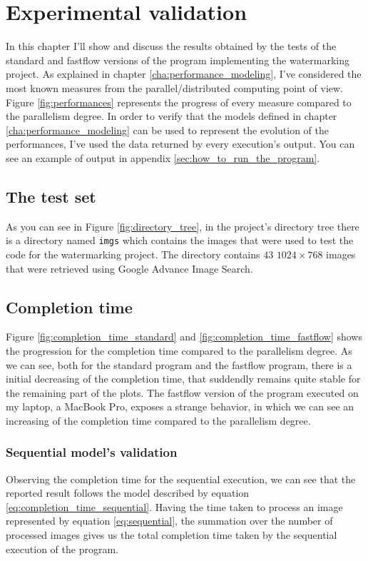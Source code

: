 \chapter{Experimental validation} %
\label{cha:experimental_validation}
    In this chapter I'll show and discuss the results obtained by the tests of the standard and fastflow
    versions of the program implementing the watermarking project. As explained in chapter
    \ref{cha:performance_modeling}, I've considered the most known measures from the parallel/distributed
    computing point of view. Figure \ref{fig:performances} represents the progress of every measure compared
    to the parallelism degree. In order to verify that the models defined in chapter
    \ref{cha:performance_modeling} can be used to represent the evolution of the performances, I've used the
    data returned by every execution's output. You can see an example of output in appendix
    \ref{sec:how_to_run_the_program}.
    \section{The test set} %
    \label{sec:the_test_set}
        As you can see in Figure \ref{fig:directory_tree}, in the project's directory tree there is a directory
        named \texttt{imgs} which contains the images that were used to test the code for the watermarking
        project. The directory contains $43$ $1024 \times 768$ images that were retrieved using Google Advance
        Image Search.
    \section{Completion time} %
    \label{sec:completion_time}
        Figure \ref{fig:completion_time_standard} and \ref{fig:completion_time_fastflow} shows the progression
        for the completion time compared to the parallelism degree. As we can see, both for the standard program
        and the fastflow program, there is a initial decreasing of the completion time, that suddendly remains
        quite stable for the remaining part of the plots. The fastflow version of the program executed on my
        laptop, a MacBook Pro, exposes a strange behavior, in which we can see an increasing of the completion
        time compared to the parallelism degree.
        \subsection{Sequential model's validation} %
        \label{sub:sequential_model_s_validation}
            Observing the completion time for the sequential execution, we can see that the
            reported result follows the model described by equation \ref{eq:completion_time_sequential}. Having
            the time taken to process an image represented by equation \ref{eq:sequential}, the summation over
            the number of processed images gives us the total completion time taken by the sequential execution
            of the program.
